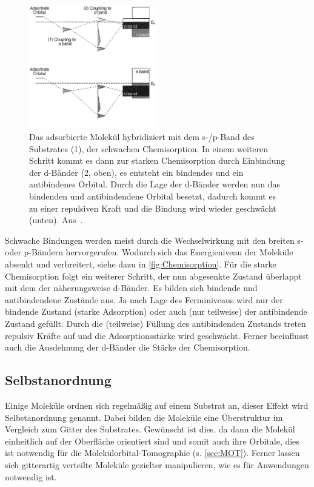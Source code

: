             \begin{figure}
                \centering
                \includegraphics[width=0.5\textwidth]{Chemisorption2.PNG}
                \caption{Das adsorbierte Molekül hybridiziert mit dem s-/p-Band des Substrates (1), der schwachen Chemisorption.
                In einem weiteren Schritt kommt es dann zur starken Chemisorption durch Einbindung der d-Bänder (2, oben), es entsteht ein bindendes und ein antibindenes Orbital.
                Durch die Lage der d-Bänder werden nun das bindenden und antibindendene Orbital besetzt, dadurch kommt es zu einer repulsiven Kraft und die Bindung wird wieder geschwächt (unten). Aus~\cite{IF_1}.}
                \label{fig:Chemisorption}
            \end{figure}
            Schwache Bindungen werden meist durch die Wechselwirkung mit den breiten s- oder p-Bändern hervorgerufen.
            Wodurch sich das Energieniveau der Moleküle absenkt und verbreitert, siehe dazu in \autoref{fig:Chemisorption}.
            Für die starke Chemisorption folgt ein weiterer Schritt, der nun abgesenkte Zustand überlappt mit dem der näherungsweise d-Bänder.
            Es bilden sich bindende und antibindendene Zustände aus.
            Ja nach Lage des Ferminiveaus wird nur der bindende Zustand (starke Adsorption) oder auch (nur teilweise) der antibindende Zustand gefüllt.
            Durch die (teilweise) Füllung des antibindenden Zustands treten repulsiv Kräfte auf und die Adsorptionsstärke wird geschwächt.
            Ferner beeinflusst auch die Ausdehnung der d-Bänder die Stärke der Chemisorption.
        
        \subsection{Selbstanordnung} \label{sec:Selbstanordnung}
            Einige Moleküle ordnen sich regelmäßig auf einem Substrat an, dieser Effekt wird Selbstanordnung genannt.
            Dabei bilden die Moleküle eine Überstruktur im Vergleich zum Gitter des Substrates.
            Gewünscht ist dies, da dann die Molekül einheitlich auf der Oberfläche orientiert sind und somit auch ihre Orbitale, dies ist notwendig für die Molekülorbital-Tomographie (s. \autoref{sec:MOT}).
            Ferner lassen sich gitterartig verteilte Moleküle gezielter manipulieren, wie es für Anwendungen notwendig ist.
            
